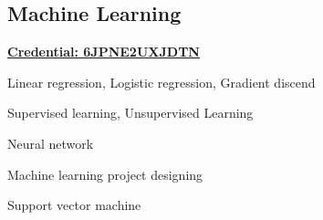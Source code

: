 \subsection{Machine Learning}
\vspace{\topsep}
\href{https://www.coursera.org/account/accomplishments/verify/6JPNE2UXJDTN}{\bf Credential: 6JPNE2UXJDTN}
\begin{tightitemize}
\item Linear regression, Logistic regression, Gradient discend
\item Supervised learning, Unsupervised Learning
\item Neural network
\item Machine learning project designing
\item Support vector machine
\end{tightitemize}

\sectionspace